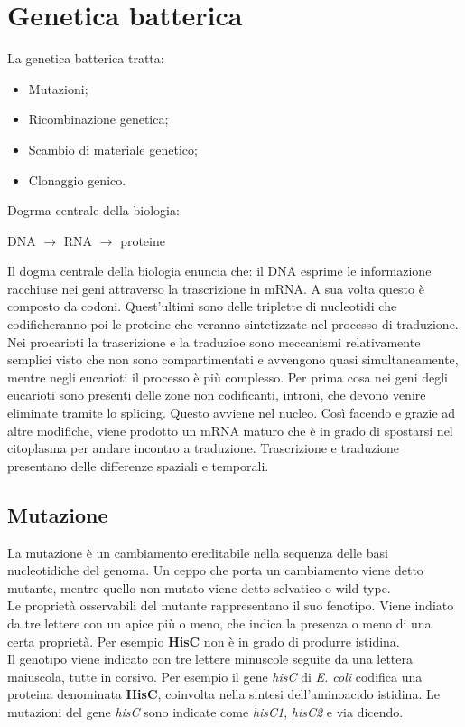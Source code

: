 \chapter{Genetica batterica}
La genetica batterica tratta: 
\begin{itemize}
    \item Mutazioni; 
    \item Ricombinazione genetica; 
    \item Scambio di materiale genetico; 
    \item Clonaggio genico.
\end{itemize}
Dogrma centrale della biologia:
\begin{center}
    DNA $\xrightarrow{}$ RNA $\xrightarrow{}$ proteine 
\end{center}
Il dogma centrale della biologia enuncia che: il DNA esprime le informazione racchiuse nei geni attraverso la trascrizione in mRNA. A sua volta questo è composto da codoni. Quest'ultimi sono delle triplette di nucleotidi che codificheranno poi le proteine che veranno sintetizzate nel processo di traduzione.
\\Nei procarioti la trascrizione e la traduzioe sono meccanismi relativamente semplici visto che non sono compartimentati e avvengono quasi simultaneamente, mentre negli eucarioti il processo è più complesso. Per prima cosa nei geni degli eucarioti sono presenti delle zone non codificanti, introni, che devono venire eliminate tramite lo splicing. Questo avviene nel nucleo. Così facendo e grazie ad altre modifiche, viene prodotto un mRNA maturo che è in grado di spostarsi nel citoplasma per andare incontro a traduzione. Trascrizione e traduzione presentano delle differenze spaziali e temporali. 
\section{Mutazione}
La mutazione è un cambiamento ereditabile nella sequenza delle basi nucleotidiche del genoma. Un ceppo che porta un cambiamento viene detto mutante, mentre quello non mutato viene detto selvatico o wild type. 
\\Le proprietà osservabili del mutante rappresentano il suo fenotipo. Viene indiato da tre lettere con un apice  più o meno, che indica la presenza o meno di una certa proprietà. Per esempio \textbf{HisC\ap{-}} non è in grado di produrre istidina.
\\Il genotipo viene indicato con tre lettere minuscole seguite da una lettera maiuscola, tutte in corsivo. Per esempio il gene \textit{hisC} di \textit{E. coli} codifica una proteina denominata \textbf{HisC}, coinvolta nella sintesi dell'aminoacido istidina. Le mutazioni del gene \textit{hisC} sono indicate come \textit{hisC1}, \textit{hisC2} e via dicendo. 
